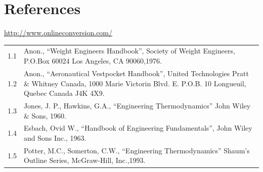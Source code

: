 \documentclass[
]{book}
\begin{document}
\hypertarget{references}{%
\section{References}\label{references}}

\url{http://www.onlineconversion.com/}

\begin{longtable}[]{@{}ll@{}}
\toprule
\endhead
\begin{minipage}[t]{0.06\columnwidth}\raggedright
1.1\strut
\end{minipage} & \begin{minipage}[t]{0.88\columnwidth}\raggedright
Anon., ``Weight Engineers Handbook'', Society of Weight Engineers, P.O.Box 60024 Los Angeles, CA 90060,1976.\strut
\end{minipage}\tabularnewline
\begin{minipage}[t]{0.06\columnwidth}\raggedright
1.2\strut
\end{minipage} & \begin{minipage}[t]{0.88\columnwidth}\raggedright
Anon., ``Aeronautical Vestpocket Handbook'', United Technologies Pratt \& Whitney Canada, 1000 Marie Victorin Blvd. E. P.O.B. 10 Longueuil, Quebec Canada J4K 4X9.\strut
\end{minipage}\tabularnewline
\begin{minipage}[t]{0.06\columnwidth}\raggedright
1.3\strut
\end{minipage} & \begin{minipage}[t]{0.88\columnwidth}\raggedright
Jones, J. P., Hawkins, G.A., ``Engineering Thermodynamics'' John Wiley \& Sons, 1960.\strut
\end{minipage}\tabularnewline
\begin{minipage}[t]{0.06\columnwidth}\raggedright
1.4\strut
\end{minipage} & \begin{minipage}[t]{0.88\columnwidth}\raggedright
Esbach, Ovid W., ``Handbook of Engineering Fundamentals'', John Wiley and Sons Inc., 1963.\strut
\end{minipage}\tabularnewline
\begin{minipage}[t]{0.06\columnwidth}\raggedright
1.5\strut
\end{minipage} & \begin{minipage}[t]{0.88\columnwidth}\raggedright
Potter, M.C., Somerton, C.W., ``Engineering Thermodynamics'' Shaum's Outline Series, McGraw-Hill, Inc.,1993.\strut
\end{minipage}\tabularnewline

\end{longtable}
\end{document}
